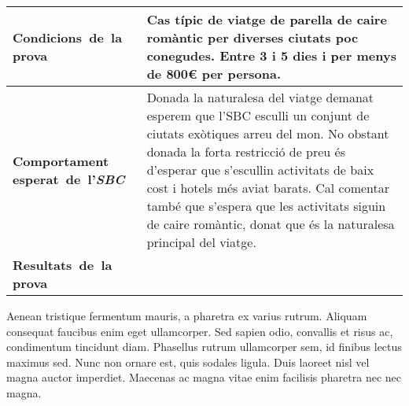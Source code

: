 \documentclass[11pt,a4paper]{article}
\begin{document}
\noindent
\begin{tabular}{|p{}|p{}|}
\hline
\textbf{\mbox{Condicions de la} \mbox{prova}} & Cas típic de viatge de parella de caire romàntic per diverses ciutats poc conegudes. Entre 3 i 5 dies i per menys de 800\euro{} per persona.\\
\hline
\textbf{Comportament \mbox{esperat de l'\emph{SBC}}} & Donada la naturalesa del viatge demanat esperem que l'SBC esculli un conjunt de ciutats exòtiques arreu del mon. No obstant donada la forta restricció de preu és d'esperar que s'escullin activitats de baix cost i hotels més aviat barats. Cal comentar també que s'espera que les activitats siguin de caire romàntic, donat que és la naturalesa principal del viatge. \\
\hline
\textbf{\mbox{Resultats de la} \mbox{prova}} & \\
\hline
\end{tabular}

Aenean tristique fermentum mauris, a pharetra ex varius rutrum. Aliquam consequat faucibus enim eget ullamcorper. Sed sapien odio, convallis et risus ac, condimentum tincidunt diam. Phasellus rutrum ullamcorper sem, id finibus lectus maximus sed. Nunc non ornare est, quis sodales ligula. Duis laoreet nisl vel magna auctor imperdiet. Maecenas ac magna vitae enim facilisis pharetra nec nec magna.
\end{document}
